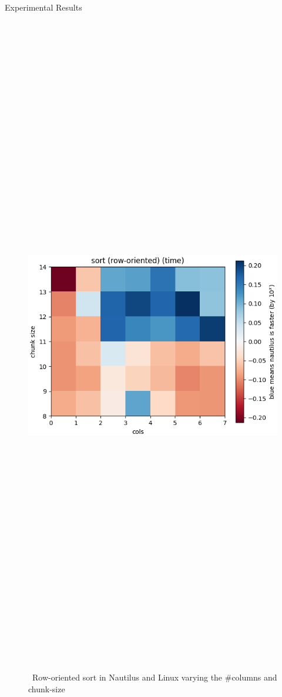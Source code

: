 \begin{block}{Experimental Results}
 
  \begin{figure}
    \includegraphics[height=30cm]{plots/sort_2d.png}
    \caption{~Row-oriented sort in Nautilus and Linux varying the \#columns and chunk-size}
    \label{fig:sort_2d}
  \end{figure}


\end{block}
